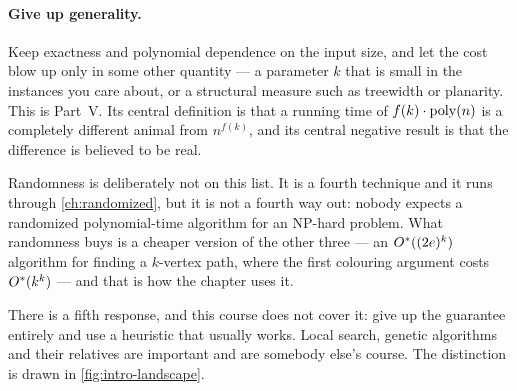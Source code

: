 \paragraph{Give up generality.} Keep exactness and polynomial dependence on the
input size, and let the cost blow up only in some other quantity --- a
parameter $k$ that is small in the instances you care about, or a structural
measure such as treewidth or planarity. This is Part~V. Its central definition
is that a running time of $f(k)\cdot\mathrm{poly}(n)$ is a completely different animal
from $n^{f(k)}$, and its central negative result is that the difference is
believed to be real.

Randomness is deliberately not on this list. It is a fourth technique and it
runs through \cref{ch:randomized}, but it is not a fourth way out: nobody
expects a randomized polynomial-time algorithm for an \textrm{NP}-hard problem.
What randomness buys is a cheaper version of the other three --- an
$O^{*}((2e)^k)$ algorithm for finding a $k$-vertex path, where the first
colouring argument costs $O^{*}(k^k)$ ---
and that is how the chapter uses it.

There is a fifth response, and this course does not cover it: give up the
guarantee entirely and use a heuristic that usually works. Local search, genetic
algorithms and their relatives are important and are somebody else's course.
The distinction is drawn in \cref{fig:intro-landscape}.

